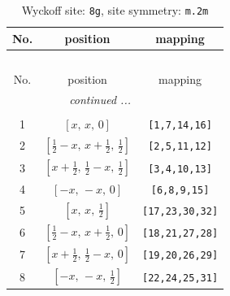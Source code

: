 \documentclass[fleqn,8pt]{jsarticle}
\begin{document}
\begin{longtable}{ccc}
\caption{Wyckoff site: {\tt 8g}, site symmetry: {\tt m.2m}}
 \\
 \hline \hline
No. & position & mapping \\ \hline \endfirsthead

\multicolumn{2}{l}{\tablename\ \thetable{}} \\
 \hline \hline
No. & position & mapping \\ \hline \endhead

 \hline \hline
\multicolumn{2}{r}{\footnotesize\it continued ...} \\ \endfoot

 \hline \hline
\multicolumn{2}{r}{} \\ \endlastfoot

1 & $\left[ x,\, x,\, 0 \right]$ & {\tt [1,7,14,16]} \\ \hline
2 & $\left[ \frac{1}{2} - x,\, x + \frac{1}{2},\, \frac{1}{2} \right]$ & {\tt [2,5,11,12]} \\ \hline
3 & $\left[ x + \frac{1}{2},\, \frac{1}{2} - x,\, \frac{1}{2} \right]$ & {\tt [3,4,10,13]} \\ \hline
4 & $\left[ - x,\, - x,\, 0 \right]$ & {\tt [6,8,9,15]} \\ \hline
5 & $\left[ x,\, x,\, \frac{1}{2} \right]$ & {\tt [17,23,30,32]} \\ \hline
6 & $\left[ \frac{1}{2} - x,\, x + \frac{1}{2},\, 0 \right]$ & {\tt [18,21,27,28]} \\ \hline
7 & $\left[ x + \frac{1}{2},\, \frac{1}{2} - x,\, 0 \right]$ & {\tt [19,20,26,29]} \\ \hline
8 & $\left[ - x,\, - x,\, \frac{1}{2} \right]$ & {\tt [22,24,25,31]} \\
\end{longtable}
\renewcommand{\arraystretch}{1.2}
\end{document}

